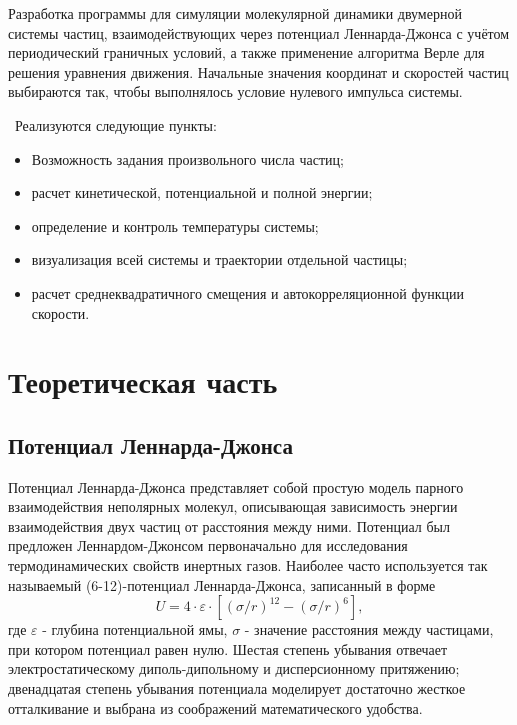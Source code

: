 \documentclass[14pt,a4paper,report]{ncc}
\begin{document}
Разработка программы для симуляции молекулярной динамики двумерной системы частиц, взаимодействующих через потенциал Леннарда-Джонса с учётом периодический граничных условий, а также применение алгоритма Верле для решения уравнения движения. Начальные значения координат и скоростей частиц выбираются так, чтобы выполнялось условие нулевого импульса системы.

\
Реализуются следующие пункты:

\begin{itemize}
\item Возможность задания произвольного числа частиц;
\item расчет кинетической, потенциальной и полной энергии;
\item определение и контроль температуры системы;
\item визуализация всей системы  и траектории отдельной частицы;
\item расчет среднеквадратичного смещения и автокорреляционной функции скорости.
\end{itemize}
\newpage\section{Теоретическая часть }
\subsection{Потенциал Леннарда-Джонса}
Потенциал Леннарда-Джонса представляет собой простую модель парного взаимодействия неполярных молекул, описывающая зависимость энергии взаимодействия двух частиц от расстояния между ними.
Потенциал был предложен Леннардом-Джонсом первоначально для исследования термодинамических свойств инертных газов. Наиболее часто используется так называемый (6-12)-потенциал Леннарда-Джонса, записанный в форме 
\
\begin{equation}
 U = 4 \cdot \varepsilon \cdot [(\sigma/r)^{12} - (\sigma/r)^{6}  ] ,
 \end{equation} 
где $\varepsilon$ - глубина потенциальной ямы, $\sigma$ - значение расстояния между частицами, при котором потенциал равен нулю. Шестая степень убывания отвечает электростатическому диполь-дипольному и дисперсионному притяжению; двенадцатая степень убывания потенциала моделирует достаточно жесткое отталкивание и выбрана из соображений математического удобства.
\
\end{document}
